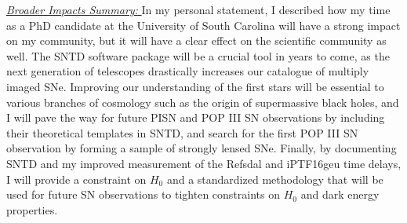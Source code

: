 \noindent\underline{\textit{Broader Impacts Summary: }}
In my personal statement, I described how my time as a PhD candidate
at the University of South Carolina will have a strong impact on my
community, but it will have a clear effect on the scientific community
as well. The SNTD software package will be a crucial tool in years to come, as the next generation of telescopes drastically increases our catalogue of multiply imaged SNe. Improving our understanding of the first stars will be essential to various branches of cosmology such as the origin of supermassive black holes, and I will pave the way for future PISN and POP III SN observations by including their theoretical templates in SNTD, and search for the first POP III SN observation by forming a sample of strongly lensed SNe. Finally, by documenting SNTD and my improved measurement of the Refsdal and iPTF16geu time delays, I will provide a constraint on $H_0$ and a standardized methodology that will be used for future SN observations to tighten constraints on $H_0$ and dark energy properties.
